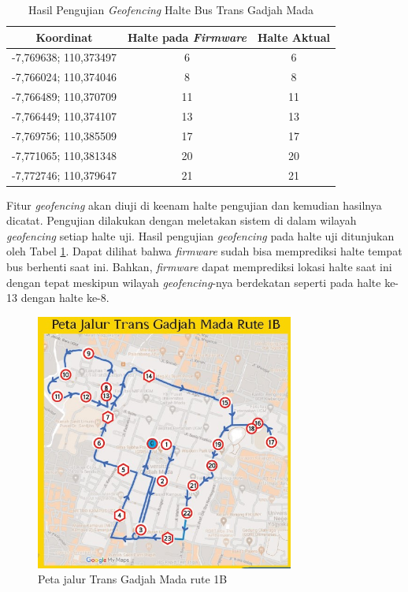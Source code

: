 \begin{table}[H]
	\caption{Hasil Pengujian \textit{Geofencing} Halte Bus Trans Gadjah Mada}
	\vspace{0.5em}
	\centering
	\begin{tabular}{ccc}
		\hline
		\textbf{Koordinat} &\textbf{Halte pada \textit{Firmware}} & \textbf{Halte Aktual}\\
		\hline 
		-7,769638; 110,373497 & 6 & 6 \\
		-7,766024; 110,374046 & 8 & 8 \\
		-7,766489; 110,370709 & 11 & 11 \\
		-7,766449; 110,374107 & 13 & 13 \\
		-7,769756; 110,385509 & 17 & 17 \\
		-7,771065; 110,381348 & 20 & 20 \\
		-7,772746; 110,379647 & 21 & 21 \\
		\hline
	\end{tabular}
	\label{Tab: geofencing-3}
\end{table}

Fitur \textit{geofencing} akan diuji di keenam halte pengujian dan kemudian hasilnya dicatat. Pengujian dilakukan dengan meletakan sistem di dalam wilayah \textit{geofencing} setiap halte uji. Hasil pengujian \textit{geofencing} pada halte uji ditunjukan oleh Tabel \ref{Tab: geofencing-3}. Dapat dilihat bahwa \textit{firmware} sudah bisa memprediksi halte tempat bus berhenti saat ini. Bahkan, \textit{firmware} dapat memprediksi lokasi halte saat ini dengan tepat meskipun wilayah \textit{geofencing}-nya berdekatan seperti pada halte ke-13 dengan halte ke-8.

\begin{figure}[H]
	\centering
	\includegraphics[width=8.5cm]{contents/chapter-4/pengujian-bergerak/Peta-Jalur-Rute-1B.jpg}
	\caption{Peta jalur Trans Gadjah Mada rute 1B}
	\label{Fig: peta-1b}
\end{figure}

